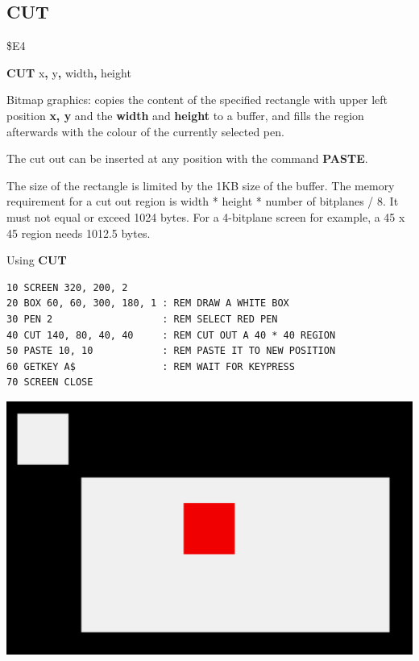 \subsection{CUT}
\begin{description}[leftmargin=2cm,style=nextline]
\item [Token:]   \$E4

\item [Format:]  {\bf CUT} x{\bf,} y{\bf,} width{\bf,} height

\item [Usage:]   Bitmap graphics: copies the content of the specified rectangle with upper left position {\bf x, y} and the {\bf width} and {\bf height} to a buffer, and fills the region afterwards with the colour of the currently selected pen.

                 The cut out can be inserted at any position with the command {\bf PASTE}.

\item [Remarks:] The size of the rectangle is limited by the 1KB size of the buffer. The memory requirement for a cut out region is width * height * number of bitplanes / 8. It must not equal or exceed 1024 bytes. For a 4-bitplane screen for example, a 45 x 45 region needs 1012.5 bytes.

\item [Example:] Using {\bf CUT}

\begin{tcolorbox}[colback=black,coltext=white]
\verbatimfont{\codefont}
\begin{verbatim}
10 SCREEN 320, 200, 2
20 BOX 60, 60, 300, 180, 1 : REM DRAW A WHITE BOX
30 PEN 2                   : REM SELECT RED PEN
40 CUT 140, 80, 40, 40     : REM CUT OUT A 40 * 40 REGION
50 PASTE 10, 10            : REM PASTE IT TO NEW POSITION
60 GETKEY A$               : REM WAIT FOR KEYPRESS
70 SCREEN CLOSE
\end{verbatim}
\end{tcolorbox}

\item \begin{center}\includegraphics[width=0.7\linewidth]{images/cut.png}\end{center}
\end{description}

